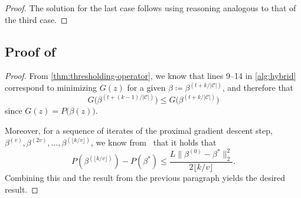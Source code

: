 \begin{proof}
  The solution for the last case follows using reasoning analogous to that of the
  third case.
\end{proof}

\subsection{Proof of }

\begin{proof}
  From \cref{thm:thresholding-operator}, we know that lines 9--14 in \cref{alg:hybrid} correspond to minimizing \(G(z)\) for a given \(\beta \coloneqq \beta^{(t + k / |\mathcal{C}|)}\), and therefore that
  \[
    G\big(\beta^{(t + (k - 1) / |\mathcal{C}|)}\big) \leq G\big(\beta^{(t + k / |\mathcal{C}|)}\big)
  \]
  since \(G(z) = P\big(\beta(z)\big)\).

  Moreover, for a sequence of iterates of the proximal gradient descent step,
  \(\beta^{(v)}, \beta^{(2v)}, \dots, \beta^{(\lfloor k / v \rfloor)}\),
  we know from~\textcite[Theorem 3.1]{beck2009} that it holds that
  \[
    P(\beta^{(\lfloor k / v \rfloor)}) - P(\beta^*)
    \leq \frac{L \lVert \beta^{(0)} - \beta^* \rVert_2^2}{2\lfloor k / v \rfloor}.
  \]
  Combining this and the result from the previous paragraph yields the desired
  result.
\end{proof}
